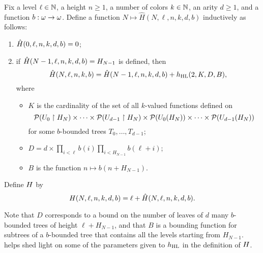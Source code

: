 \begin{definition}
	Fix a level $\ell \in \mathbb{N}$, a height $n \geq 1$, a number of colors $k \in \mathbb{N}$, an arity $d \geq 1$, and a function $b:\omega\to\omega$. Define a function $N \mapsto \hat{H}(N,\ell,n,k,d,b)$ inductively as follows:
	\begin{enumerate}
		\item $\hat{H}(0,\ell,n,k,d,b)=0$;
		\item if $\hat{H}(N-1,\ell, n,k,d,b) = H_{N-1}$ is defined, then
		\[
   			\hat{H}(N,\ell,n,k,b)= \hat{H}(N-1,\ell,n,k,d,b) + h_{\mathrm{HL}}(2, K, D, B),
  		\]
  		where
  		\begin{itemize}
  			\item $K$ is the cardinality of the set of all $k$-valued functions defined on
  			\[
  			\mathcal{P}(U_0 \upharpoonright H_N) \times \cdots \times \mathcal{P}(U_{d-1} \upharpoonright H_N) \times \mathcal{P}(U_0(H_N)) \times \cdots \times \mathcal{P}(U_{d-1}(H_N))
 			 \]
  			for some $b$-bounded trees $T_0,\ldots,T_{d-1}$;
  			\item $D=d\times\prod_{i<\ell}b(i)\prod_{i<H_{N-1}}b(\ell+i)$;
  			\item $B$ is the function $n \mapsto b(n+H_{N-1})$.
  		\end{itemize}
	\end{enumerate}
	Define $H$ by
	\[
		H(N,\ell, n,k,d,b)= \ell+\hat{H}(N,\ell,n,k,d,b).
	\] 
\end{definition}

Note that $D$ corresponds to a bound on the number of leaves of $d$ many $b$-bounded trees of height $\ell+H_{N-1}$, and that $B$ is a bounding function for subtrees of a $b$-bounded tree that contains all the level{s} starting from $H_{N-1}$.  helps shed light on some of the parameters given to $h_{\mathrm{HL}}$ in the definition of $H$.




